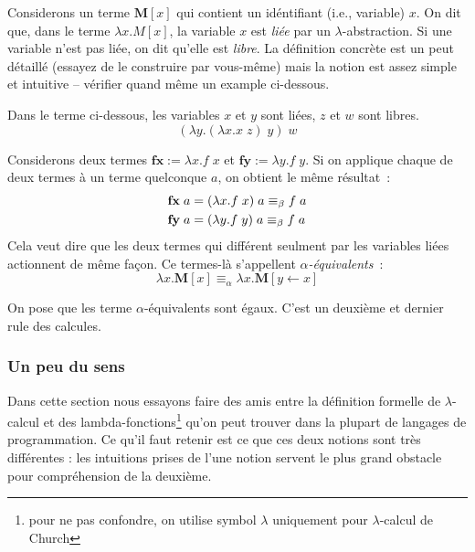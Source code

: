 

Considerons un terme $\mathbf{M}[x]$ qui contient un idéntifiant (i.e., variable) $x$.
On dit que, dans le terme $\lambda x.M[x]$, la variable $x$ est \emph{liée} par un $\lambda$-abstraction.
Si une variable n'est pas liée, on dit qu'elle est \emph{libre}.
La définition concrète est un peut détaillé (essayez de le construire par vous-même) mais la notion est assez simple et intuitive -- vérifier quand même un example ci-dessous.
\begin{example}
	Dans le terme ci-dessous, les variables $x$ et $y$ sont liées, $z$ et $w$ sont libres.
	$$(\lambda y. (\lambda x. x \; z) \; y) \; w$$
\end{example}
Considerons deux termes $\mathbf{fx} := \lambda x. f \; x$ et $\mathbf{fy} := \lambda y. f \; y$.
Si on applique chaque de deux termes à un terme quelconque $a$, on obtient le même résultat~:
\begin{align*}
	\mathbf{fx} \; a &= (\lambda x. f \; x) \; a \equiv_\beta f \; a \\
	\mathbf{fy} \; a &= (\lambda y. f \; y) \; a \equiv_\beta f \; a
\end{align*}
Cela veut dire que les deux termes qui différent seulment par les variables liées actionnent de même façon.
Ce termes-là s'appellent \emph{$\alpha$-équivalents}~:
$$\lambda x. \mathbf{M}[x] \equiv_\alpha \lambda x. \mathbf{M}[y \leftarrow x]$$

On pose que les terme $\alpha$-équivalents sont égaux.
C'est un deuxième et dernier rule des calcules.

\subsubsection*{Un peu du sens}
Dans cette section nous essayons faire des amis entre la définition formelle de $\lambda$-calcul et des lambda-fonctions\footnote{pour ne pas confondre, on utilise symbol $\lambda$ uniquement pour $\lambda$-calcul de Church} qu'on peut trouver dans la plupart de langages de programmation. Ce qu'il faut retenir est ce que ces deux notions sont très différentes : les intuitions prises de l'une notion servent le plus grand obstacle pour compréhension de la deuxième.

